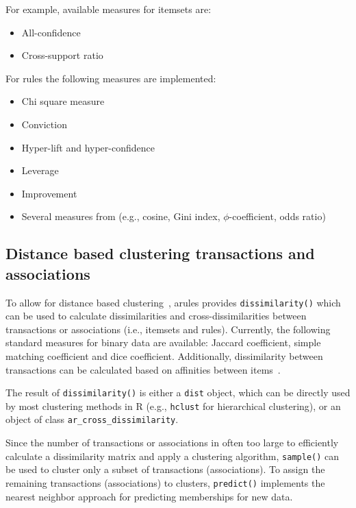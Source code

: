 \documentclass[10pt,a4paper]{article}
\newcommand{\strong}[1]{{\normalfont\fontseries{b}\selectfont #1}}
\newcommand{\func}[1]{\mbox{\texttt{#1()}}}
\newcommand{\code}[1]{\mbox{\texttt{#1}}}
\newcommand{\pkg}[1]{\strong{#1}}
\begin{document}
For example, available measures for itemsets are:
\begin{itemize}
\item All-confidence~\citep{arules:Omiecinski:2003}
\item Cross-support ratio~\citep{arules:Xiong+Tan+Kumar:2003}
\end{itemize}

For rules the following measures are implemented:
\begin{itemize}
\item Chi square measure~\citep{arules:Liu+Hsu+Ma:1999}
\item Conviction~\citep{arules:Brin+Motwani+Ullman+Tsur:1997} 
\item Hyper-lift and hyper-confidence~\citep{arules:Hahsler+Hornik:2007} 
\item Leverage~\citep{arules:Piatetsky-Shapiro:1991} 
\item Improvement~\citep{arules:Bayardo+Agrawal+Gunopulos:2000} 
\item Several measures from \cite{arules:Tan+Kumar+Srivastava2004} 
  (e.g., cosine, Gini index, $\phi$-coefficient, odds ratio)
\end{itemize}

\subsection{Distance based clustering transactions and associations}

To allow for distance based clustering~\citep{arules:Gupta+Strehl+Ghosh:1999},
\pkg{arules} provides \func{dissimilarity} which can be used to calculate
dissimilarities and cross-dissimilarities between transactions or associations
(i.e., itemsets and rules). Currently, the following standard measures for
binary data are available: Jaccard coefficient, simple matching coefficient and
dice coefficient. Additionally, dissimilarity between transactions can be
calculated based on affinities between
items~\citep{arules:Aggarwal+Procopiuc+Yu:2002}.

The result of \func{dissimilarity} is either a \code{dist} object, which can be
directly used by most clustering methods in R (e.g., \code{hclust} for
hierarchical clustering), or an object of class \code{ar\_cross\_dissimilarity}.

Since the number of transactions or associations in often too large to
efficiently calculate a dissimilarity matrix and apply a clustering algorithm,
\func{sample} can be used to cluster only a subset of transactions 
(associations). To assign the remaining transactions (associations)
to clusters, \func{predict} implements the nearest neighbor approach for
predicting memberships for new data.
\end{document}
